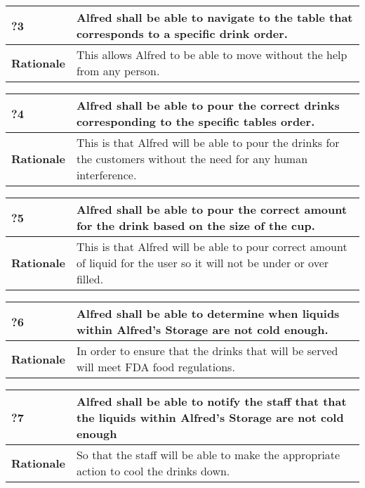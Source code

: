 \documentclass [11pt]{article}
\begin{document}
\begin{longtable}{| p{ } | p{ } | }\hline 
\rowcolor{tableCell}\textbf{?3} &  Alfred shall be able to navigate to the table that corresponds to a specific drink order. \\ \hline
\textbf{Rationale} & This allows Alfred to be able to move without the help from any person. \\ \hline 
\end{longtable}

\begin{longtable}{| p{ } | p{ } | }\hline 
\rowcolor{tableCell}\textbf{?4} & Alfred shall be able to pour the correct drinks corresponding to the specific tables order.\\ \hline
\textbf{Rationale} &  This is that Alfred will be able to pour the drinks for the customers without the need for any human interference. \\ \hline 
\end{longtable}

\begin{longtable}{| p{ } | p{ } | }\hline 
	\rowcolor{tableCell}\textbf{?5} & Alfred shall be able to pour the correct amount for the drink based on the size of the cup.\\ \hline
	\textbf{Rationale} &  This is that Alfred will be able to pour correct amount of liquid for the user so it will not be under or over filled. \\ \hline 
\end{longtable}

\begin{longtable}{| p{ } | p{ } | }\hline 
	\rowcolor{tableCell}\textbf{?6} & Alfred shall be able to determine when liquids within Alfred's Storage are not cold enough.\\ \hline
	\textbf{Rationale} &  In order to ensure that the drinks that will be served will meet FDA food regulations. \\ \hline 
\end{longtable}

\begin{longtable}{| p{ } | p{ } | }\hline 
	\rowcolor{tableCell}\textbf{?7} & Alfred shall be able to notify the staff that that the liquids within Alfred's Storage are not cold enough\\ \hline
	\textbf{Rationale} &  So that the staff will be able to make the appropriate action to cool the drinks down.\\ \hline 
\end{longtable}
\end{document}
